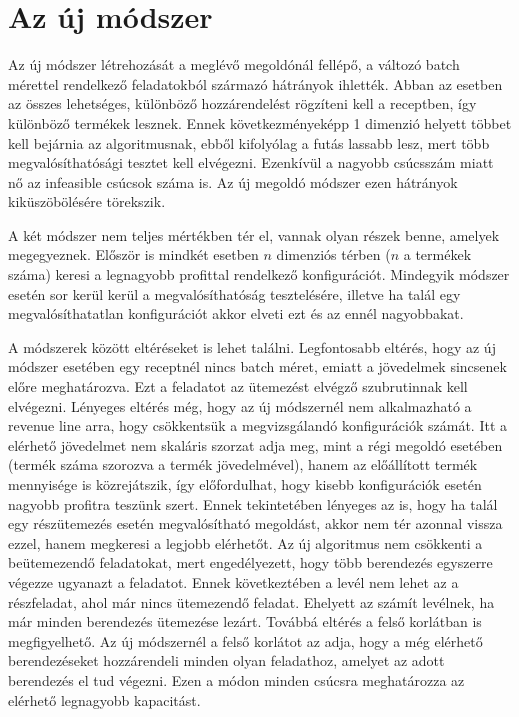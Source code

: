 \chapter{Az új módszer}
Az új módszer létrehozását a meglévő megoldónál fellépő, a változó batch mérettel rendelkező feladatokból származó hátrányok ihlették.
Abban az esetben az összes lehetséges, különböző hozzárendelést rögzíteni kell a receptben, így különböző termékek lesznek.
Ennek következményeképp 1 dimenzió helyett többet kell bejárnia az algoritmusnak, ebből kifolyólag a futás lassabb lesz, mert több megvalósíthatósági tesztet kell elvégezni.
Ezenkívül a nagyobb csúcsszám miatt nő az infeasible csúcsok száma is.
Az új megoldó módszer ezen hátrányok kiküszöbölésére törekszik. 

A két módszer nem teljes mértékben tér el, vannak olyan részek benne, amelyek megegyeznek.
Először is mindkét esetben $n$ dimenziós térben ($n$ a termékek száma) keresi a legnagyobb profittal rendelkező konfigurációt.
Mindegyik módszer esetén sor kerül kerül a megvalósíthatóság tesztelésére, illetve ha talál egy megvalósíthatatlan konfigurációt akkor elveti ezt és az ennél nagyobbakat. 

A módszerek között eltéréseket is lehet találni.
Legfontosabb eltérés, hogy az új módszer esetében egy receptnél nincs batch méret, emiatt a jövedelmek sincsenek előre meghatározva.
Ezt a feladatot az ütemezést elvégző szubrutinnak kell elvégezni.
Lényeges eltérés még, hogy az új módszernél nem alkalmazható a revenue line arra, hogy csökkentsük a megvizsgálandó konfigurációk számát.
Itt a elérhető jövedelmet nem skaláris szorzat adja meg, mint a régi megoldó esetében (termék száma szorozva a termék jövedelmével), hanem az előállított termék mennyisége is közrejátszik, így előfordulhat, hogy kisebb konfigurációk esetén nagyobb profitra teszünk szert.
Ennek tekintetében lényeges az is, hogy ha talál egy részütemezés esetén megvalósítható megoldást, akkor nem tér azonnal vissza ezzel, hanem megkeresi a legjobb elérhetőt.
Az új algoritmus nem csökkenti a beütemezendő feladatokat, mert engedélyezett, hogy több berendezés egyszerre végezze ugyanazt a feladatot.
Ennek következtében a levél nem lehet az a részfeladat, ahol már nincs ütemezendő feladat.
Ehelyett az számít levélnek, ha már minden berendezés ütemezése lezárt.
Továbbá eltérés a felső korlátban is megfigyelhető.
Az új módszernél a felső korlátot az adja, hogy a még elérhető berendezéseket hozzárendeli minden olyan feladathoz, amelyet az adott berendezés el tud végezni.
Ezen a módon minden csúcsra meghatározza az elérhető legnagyobb kapacitást.

